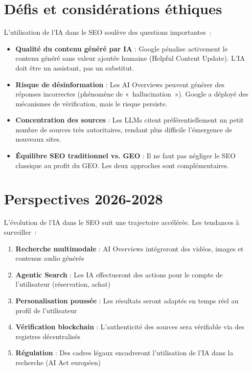 \documentclass[12pt,a4paper,twoside]{report}
\begin{document}
\section{Défis et considérations éthiques}

L'utilisation de l'IA dans le SEO soulève des questions importantes~:

\begin{itemize}
    \item \textbf{Qualité du contenu généré par IA} : Google pénalise activement le contenu généré sans valeur ajoutée humaine (Helpful Content Update). L'IA doit être un assistant, pas un substitut.
    \item \textbf{Risque de désinformation} : Les AI Overviews peuvent générer des réponses incorrectes (phénomène de «~hallucination~»). Google a déployé des mécanismes de vérification, mais le risque persiste.
    \item \textbf{Concentration des sources} : Les LLMs citent préférentiellement un petit nombre de sources très autoritaires, rendant plus difficile l'émergence de nouveaux sites.
    \item \textbf{Équilibre SEO traditionnel vs. GEO} : Il ne faut pas négliger le SEO classique au profit du GEO. Les deux approches sont complémentaires.
\end{itemize}

\section{Perspectives 2026-2028}

L'évolution de l'IA dans le SEO suit une trajectoire accélérée. Les tendances à surveiller~:

\begin{enumerate}
    \item \textbf{Recherche multimodale} : AI Overviews intégreront des vidéos, images et contenus audio générés
    \item \textbf{Agentic Search} : Les IA effectueront des actions pour le compte de l'utilisateur (réservation, achat)
    \item \textbf{Personalisation poussée} : Les résultats seront adaptés en temps réel au profil de l'utilisateur
    \item \textbf{Vérification blockchain} : L'authenticité des sources sera vérifiable via des registres décentralisés
    \item \textbf{Régulation} : Des cadres légaux encadreront l'utilisation de l'IA dans la recherche (AI Act européen)
\end{enumerate}
\end{document}
